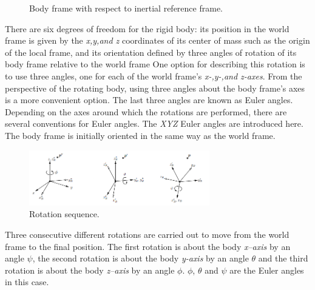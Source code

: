 \begin{figure}[H]
\centering
{}
\caption{Body frame with respect to inertial reference frame.} \label{fig:reff}
\end{figure}


There are six degrees of freedom for the rigid body: its position in the world frame is given by the \textit{x,y,and z} coordinates of its center of mass such as the origin of the local frame, and its orientation defined by three angles of rotation of its body frame relative to the world frame One option for describing this rotation is to use three angles, one for each of the world frame's \textit{x-,y-,and z-axes}. From the perspective of the rotating body, using three angles about the body frame's axes is a more convenient option. The last three angles are known as Euler angles. 
Depending on the axes around which the rotations are performed, there are several conventions for Euler angles. The \textit{XYZ} Euler angles are introduced here. The body frame is initially oriented in the same way as the world frame.
\begin{figure}[H]
    \centering
    \includegraphics[width = 0.7\textwidth]{Figures/ea2.png}
    \caption{Rotation sequence.}
    \label{fig:ea}
\end{figure}
Three consecutive different rotations are carried out to move from the world frame to the final position. The first rotation is about the body \textit{x–axis} by an angle $\psi$, the second rotation is about the body \textit{y-axis} by an angle $\theta$ and the third rotation is about the body \textit{z–axis} by an angle $\phi$. $\phi$, $\theta$ and $\psi$ are the Euler angles in this case.

